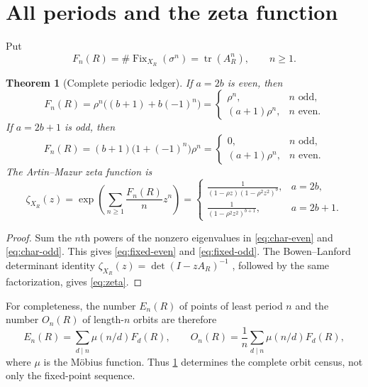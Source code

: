 \documentclass[11pt,a4paper]{amsart}
\newtheorem{theorem}{Theorem}[section]
\theoremstyle{definition}
\theoremstyle{remark}
\newcommand{\Fix}{\operatorname{Fix}}
\begin{document}
\section{All periods and the zeta function}
\label{sec:periods}

Put
\[
 F_n(R)=\#\Fix_{X_R}(\sigma^n)=\operatorname{tr}(A_R^n),
 \qquad n\geq1.
\]

\begin{theorem}[Complete periodic ledger]
\label{thm:periods}
If $a=2b$ is even, then
\begin{equation}\label{eq:fixed-even}
 F_n(R)=\rho^n\bigl((b+1)+b(-1)^n\bigr)
 =
 \begin{cases}
  \rho^n,&n\text{ odd},\\
  (a+1)\rho^n,&n\text{ even}.
 \end{cases}
\end{equation}
If $a=2b+1$ is odd, then
\begin{equation}\label{eq:fixed-odd}
 F_n(R)=(b+1)\bigl(1+(-1)^n\bigr)\rho^n
 =
 \begin{cases}
  0,&n\text{ odd},\\
  (a+1)\rho^n,&n\text{ even}.
 \end{cases}
\end{equation}
The Artin--Mazur zeta function is
\begin{equation}\label{eq:zeta}
 \zeta_{X_R}(z)
 =\exp\left(\sum_{n\geq1}\frac{F_n(R)}n z^n\right)
 =
 \begin{cases}
  \displaystyle\frac{1}{(1-\rho z)(1-\rho^2z^2)^b},&a=2b,\\[8pt]
  \displaystyle\frac{1}{(1-\rho^2z^2)^{b+1}},&a=2b+1.
 \end{cases}
\end{equation}
\end{theorem}

\begin{proof}
Sum the $n$th powers of the nonzero eigenvalues in
\eqref{eq:char-even} and \eqref{eq:char-odd}.  This gives
\eqref{eq:fixed-even} and \eqref{eq:fixed-odd}.  The Bowen--Lanford
determinant identity $\zeta_{X_R}(z)=\det(I-zA_R)^{-1}$
\cite{BowenLanford1970}, followed by the same factorization, gives
\eqref{eq:zeta}.
\end{proof}

For completeness, the number $E_n(R)$ of points of least period $n$ and the
number $O_n(R)$ of length-$n$ orbits are therefore
\begin{equation}\label{eq:least-period}
 E_n(R)=\sum_{d\mid n}\mu(n/d)F_d(R),
 \qquad
 O_n(R)=\frac1n\sum_{d\mid n}\mu(n/d)F_d(R),
\end{equation}
where $\mu$ is the M\"obius function.  Thus \cref{thm:periods} determines
the complete orbit census, not only the fixed-point sequence.
\end{document}
